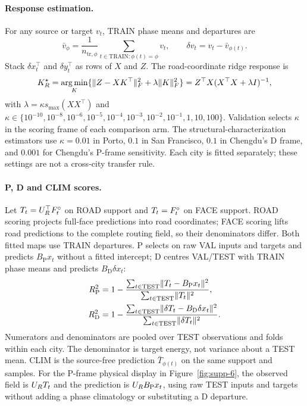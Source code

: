 \paragraph{Response estimation.} For any source or target $v_t$, TRAIN phase means and departures are
\begin{equation}
 \bar v_\phi=\frac{1}{n_{\mathrm{tr},\phi}}
 \sum_{t\in\mathrm{TRAIN}:\phi(t)=\phi}v_t,
 \qquad \delta v_t=v_t-\bar v_{\phi(t)} .
 \label{eq:supp-phase-centre}
\end{equation}
Stack $\delta x_t^\top$ and $\delta y_t^\top$ as rows of $X$ and $Z$. The road-coordinate ridge response is
\begin{equation}
 K_R^\star=\operatorname*{arg\,min}_K\{\lVert Z-XK^\top \rVert_F^2+\lambda\lVert K \rVert_F^2\}
 =Z^\top X(X^\top X+\lambda I)^{-1},
 \label{eq:supp-ridge}
\end{equation}
with $\lambda=\kappa s_{\max}(XX^\top)$ and
$\kappa\in\{10^{-10},10^{-8},10^{-6},10^{-5},10^{-4},10^{-3},10^{-2},10^{-1},1,10,100\}$.
Validation selects $\kappa$ in the scoring frame of each comparison arm. The structural-characterization estimators use $\kappa=0.01$ in Porto, $0.1$ in San Francisco, $0.1$ in Chengdu's D frame, and $0.001$ for Chengdu's P-frame sensitivity. Each city is fitted separately; these settings are not a cross-city transfer rule.

\paragraph{P, D and CLIM scores.} Let $T_t=U_{R}^\top F^{\circ}_t$ on ROAD support and $T_t=F^{\circ}_t$ on FACE support. ROAD scoring projects full-face predictions into road coordinates; FACE scoring lifts road predictions to the complete routing field, so their denominators differ. Both fitted maps use TRAIN departures. P selects on raw VAL inputs and targets and predicts $B_{\mathrm P}x_t$ without a fitted intercept; D centres VAL/TEST with TRAIN phase means and predicts $B_{\mathrm D}\delta x_t$:
\begin{equation}
\begin{aligned}
 R_{\mathrm P}^2&=1-\frac{\sum_{t\in\mathrm{TEST}}\lVert T_t-B_{\mathrm P}x_t \rVert^2}{\sum_{t\in\mathrm{TEST}}\lVert T_t \rVert^2},\\
 R_{\mathrm D}^2&=1-\frac{\sum_{t\in\mathrm{TEST}}\lVert \delta T_t-B_{\mathrm D}\delta x_t \rVert^2}{\sum_{t\in\mathrm{TEST}}\lVert \delta T_t \rVert^2}.
\end{aligned}
\label{eq:supp-pd-scores}
\end{equation}
Numerators and denominators are pooled over TEST observations and folds within each city. The denominator is target energy, not variance about a TEST mean. CLIM is the source-free prediction $\bar T_{\phi(t)}$ on the same support and samples. For the P-frame physical display in Figure~\ref{fig:supp-6}, the observed field is $U_{R} T_t$ and the prediction is $U_{R} B_{\mathrm P}x_t$, using raw TEST inputs and targets without adding a phase climatology or substituting a D departure.

